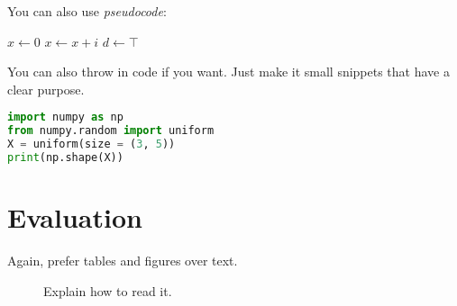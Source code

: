 \documentclass[a0]{sciposter} %
\begin{document}
\begin{multicols}{2}
\lipsum[2]

You can also use {\em pseudocode}:

\begin{algorithmic}[1]
\State $x \leftarrow 0$
	\State $x \leftarrow x + i$
\EndFor
{}
    \State $d \leftarrow \top$
\EndIf
\end{algorithmic} 

You can also throw in code if you want. Just make it small snippets
that have a clear purpose.
\begin{lstlisting}[language=Python, caption=Cool beans]
import numpy as np
from numpy.random import uniform
X = uniform(size = (3, 5))
print(np.shape(X))
\end{lstlisting}

\section{Evaluation}

Again, prefer tables and figures over text.

\lipsum[3]

\begin{figure}
\setcounter{figure}{1} 
\captionsetup{type=figure} 
\begin{center}
  
\end{center}
\caption{Explain how to read it.}
\label{curvas}
\end{figure}

\lipsum[1]

\begin{table}
\setcounter{table}{0} 
\captionsetup{type=table} 
\caption{Explain the notation.}
\label{data}
\begin{center}
\end{center}
\end{table}


\end{multicols}
\end{document}
